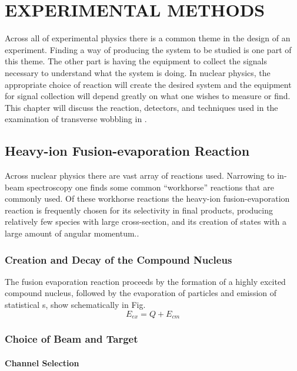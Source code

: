 %
%

\chapter{EXPERIMENTAL METHODS}
\label{chp:exp-pr}
Across all of experimental physics there is a common theme in the design of an experiment. Finding a way of producing the system to be studied is one part of this theme. The other part is having the equipment to collect the signals necessary to understand what the system is doing. In nuclear physics, the appropriate choice of reaction will create the desired system and the equipment for signal collection will depend greatly on what one wishes to measure or find. This chapter will discuss the reaction, detectors, and techniques used in the examination of transverse wobbling in \pr{}.
\section{Heavy-ion Fusion-evaporation Reaction}
\label{sec:exp-pr-fus-evap}
Across nuclear physics there are vast array of reactions used. Narrowing to in-beam \gr{} spectroscopy one finds some common ``workhorse'' reactions that are commonly used. Of these workhorse reactions the heavy-ion fusion-evaporation reaction is frequently chosen for its selectivity in final products, producing relatively few species with large cross-section, and its creation of states with a large amount of angular momentum.\cite{beausang1996arrays}.
\subsection{Creation and Decay of the Compound Nucleus}
\label{ssec:exp-pr-fus-evap-cn}
The fusion evaporation reaction proceeds by the formation of a highly excited compound nucleus\cite{bohr1936neutron}, followed by the evaporation of particles and emission of statistical \gr{}s, show schematically in Fig.
\begin{equation}
\label{eqn:cn_ex_en}
E_{ex} = Q + E_{cm}
\end{equation}

\subsection{Choice of Beam and Target}
\label{ssec:exp-pr-fus-evap-beam-target}
\subsubsection{Channel Selection}
\label{sssec:exp-pr-fus-evap-beam-target-channel}
